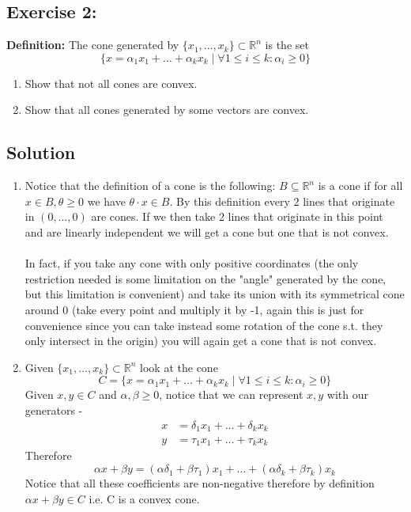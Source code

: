 \documentclass{article}
\begin{document}
\newpage
\subsection{Exercise 2:}
\textbf{Definition:} The cone generated by $\{x_1,\dots,x_k\}\subset \mathbb{R}^n$ is the set  \[\{x = \alpha_1 x_1 + \dots + \alpha_k x_k \mid \forall 1\leq i\leq k: \alpha_i\geq 0\}\]
\begin{enumerate}
    \item Show that not all cones are convex.
    \item Show that all cones generated by some vectors are convex.
\end{enumerate}
\subsection*{Solution}
\begin{enumerate}
    \item Notice that the definition of a cone is the following: $B\subseteq\mathbb{R}^n$ is a cone if for all $x\in B, \theta\geq 0$ we have $\theta\cdot x\in B$. By this definition every 2 lines that originate in $(0, \dots, 0)$ are cones. If we then take 2 lines that originate in this point and are linearly independent we will get a cone but one that is not convex. \\ \\ In fact, if you take any cone with only positive coordinates (the only restriction needed is some limitation on the "angle" generated by the cone, but this limitation is convenient) and take its union with its symmetrical cone around 0 (take every point and multiply it by -1, again this is just for convenience since you can take instead some rotation of the cone s.t. they only intersect in the origin) you will again get a cone that is not convex.
    \item Given $\{x_1,\dots,x_k\}\subset \mathbb{R}^n$ look at the cone \[C = \{x = \alpha_1 x_1 + \dots + \alpha_k x_k \mid \forall 1\leq i\leq k: \alpha_i\geq 0\}\] Given $x,y\in C$ and $\alpha,\beta\geq 0$, notice that we can represent $x,y$ with our generators - 
    \begin{align*}
        x &= \delta_1 x_1 + \dots + \delta_k x_k \\
        y &= \tau_1 x_1 + \dots + \tau_k x_k
    \end{align*}
    Therefore \[\alpha x +\beta y = (\alpha\delta_1 +\beta\tau_1)x_1 + \dots + (\alpha\delta_k +\beta\tau_k)x_k\] Notice that all these coefficients are non-negative therefore by definition $\alpha x+\beta y\in C$ i.e. C is a convex cone. 
\end{enumerate}
\newpage
\end{document}
